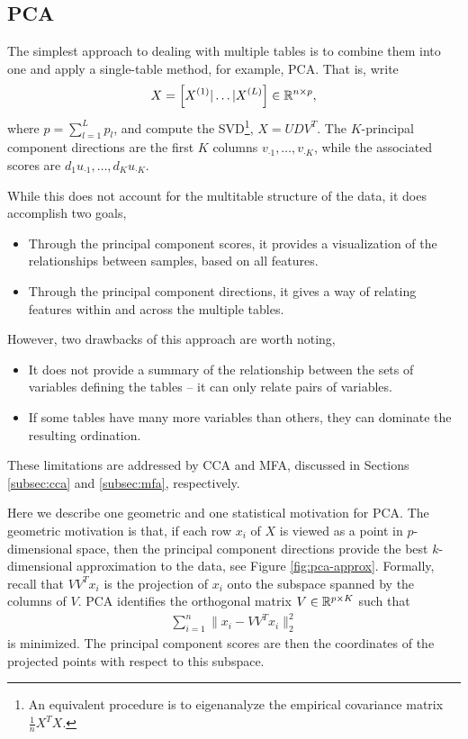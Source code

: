 \documentclass{article}
\begin{document}
\subsection{PCA}
\label{subsec:pca}

The simplest approach to dealing with multiple tables is to combine them into
one and apply a single-table method, for example, PCA. That is, write
\begin{align*}
X = \left[X^{(1)} \vert \dots \vert X^{(L)}\right] \in \mathbb{R}^{n \times p},
\end{align*}
where $p = \sum_{l = 1}^{L}p_{l}$, and compute the SVD\footnote{An equivalent
  procedure is to eigenanalyze the empirical covariance matrix
  $\frac{1}{n}X^{T}X$.}, $X = UDV^{T}$. The $K$-principal component directions
are the first $K$ columns $v_{\cdot 1}, \dots, v_{\cdot K}$, while the
associated scores are $d_{1}u_{\cdot 1}, \dots, d_{K}u_{\cdot K}$.

While this does not account for the multitable structure of the data, it does
accomplish two goals,
\begin{itemize}
\item Through the principal component scores, it provides a visualization of the
  relationships between samples, based on all features.
\item Through the principal component directions, it gives a way of relating
  features within and across the multiple tables.
\end{itemize}

However, two drawbacks of this approach are worth noting,
\begin{itemize}
  \item It does not provide a summary of the relationship between the sets of
    variables defining the tables -- it can only relate pairs of
    variables. \label{bullet:pca_drawback_one}
  \item If some tables have many more variables than others, they can dominate
    the resulting ordination. \label{bullet:pca_drawback_two}
\end{itemize}

These limitations are addressed by CCA and MFA, discussed in Sections
\ref{subsec:cca} and \ref{subsec:mfa}, respectively.

Here we describe one geometric and one statistical motivation for PCA. The
geometric motivation is that, if each row $x_{i}$ of $X$ is viewed as a point in
$p$-dimensional space, then the principal component directions provide the best
$k$-dimensional approximation to the data, see Figure \ref{fig:pca-approx}.
Formally, recall that $VV^{T}x_{i}$ is the projection of $x_{i}$ onto the
subspace spanned by the columns of $V$. PCA identifies the orthogonal matrix $V
\in \mathbb{R}^{p \times K}$ such that
\begin{align*}
\sum_{i = 1}^{n}\|x_{i} - VV^{T} x_{i}\|_{2}^{2}
\end{align*}
is minimized. The principal component scores are then the coordinates of the
projected points with respect to this subspace.
\end{document}
